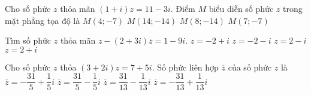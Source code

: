 \begin{ex}%
Cho số phức $z$ thỏa mãn $(1+i)z=11-3i$. Điểm $M$ biểu diễn số phức $z$ trong mặt phẳng tọa độ là
\choice
{\True $M(4;-7)$}
{$M(14;-14)$}
{$M(8;-14)$}
{$M(7;-7)$}
\end{ex}

\begin{ex}%
Tìm số phức $z$ thỏa mãn $z-(2+3i)\overline{z} = 1 - 9i$.
\choice
{$z= -2 + i$}
{$z= -2-i$}
{\True $z= 2-i$}
{$z= 2+i$}
\end{ex}


\begin{ex}%
Cho số phức $z$ thỏa $(3+2i)z=7+5i$. Số phức liên hợp $\overline{z}$ của số phức $z$ là
\choice
{$\overline{z} = -\dfrac{31}{5}+\dfrac{1}{5}i$}
{$\overline{z} = \dfrac{31}{5}-\dfrac{1}{5}i$}
{\True $\overline{z} = \dfrac{31}{13}-\dfrac{1}{13}i$}
{$\overline{z} = -\dfrac{31}{13}+\dfrac{1}{13}i$}
\end{ex}


